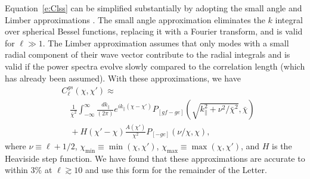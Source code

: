 \documentclass[twocolumn,nofootinbib,prl,floatfix]{revtex4-1}
\newcommand{\ud}{\,d}
\begin{document}
Equation~\ref{e:Clss} can be simplified substantially by adopting the small
angle and Limber approximations \citep{1953ApJ...117..134L,
1992ApJ...388..272K, 1998ApJ...498...26K}.  The small angle
approximation eliminates the $k$ integral over spherical Bessel functions, replacing it
with a Fourier transform, and is valid for $\ell \gg 1$. The Limber
approximation assumes that only modes with a small radial component of their wave
vector contribute to the radial integrals and is valid if the power spectra
evolve slowly compared to the correlation length \citep{2008PhRvD..78l3506L}
(which has already been
assumed). With these approximations, we have
\begin{align}
    &C^{gs}_\ell(\chi, \chi') \approx
    \nonumber \\ & \quad
    \frac{1}{\bar\chi^2}
        \int_{-\infty}^\infty\frac{\ud k_\parallel}{(2 \pi)} 
        e^{i k_\parallel (\chi - \chi')}
        P_{[gf - ge]}
        (\sqrt{k_\parallel^2 + \nu^2/\bar\chi^2}, \bar\chi)
    \nonumber \\ & \quad +
    H(\chi' - \chi)
    \frac{A(\chi')}{\chi^2}
    P_{[- ge]}(\nu/\chi, \chi),
    \label{e:Clss_limber}
\end{align}
where $\nu\equiv\ell + 1/2$, $\chi_{\min} \equiv \min(\chi, \chi')$,
$\chi_{\max} \equiv \max(\chi, \chi')$, and $H$ is the Heaviside step function.
We have found that these approximations are accurate to within $3\%$ at
$\ell \gtrsim 10$
and use this form for the remainder of the Letter. 



\end{document}
